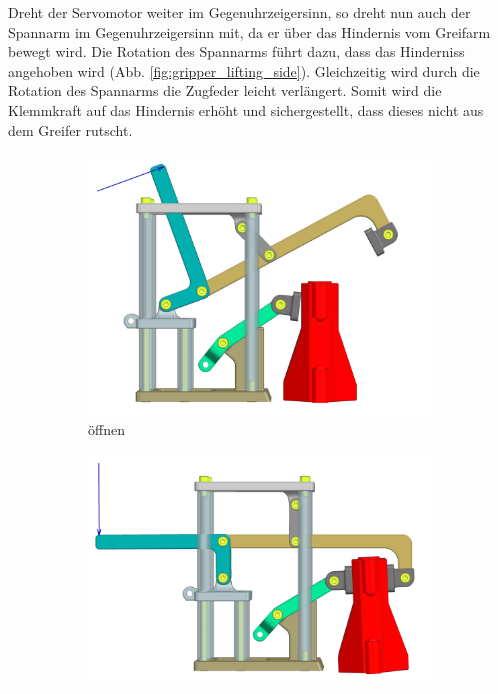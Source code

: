 Dreht der Servomotor weiter im Gegenuhrzeigersinn, so dreht nun auch der Spannarm im Gegenuhrzeigersinn mit, da er über das Hindernis vom Greifarm bewegt wird. Die Rotation des Spannarms führt dazu, dass das Hinderniss angehoben wird (Abb. \ref{fig:gripper_lifting_side}). Gleichzeitig wird durch die Rotation des Spannarms die Zugfeder leicht verlängert. Somit wird die Klemmkraft auf das Hindernis erhöht und sichergestellt, dass dieses nicht aus dem Greifer rutscht.

\begin{figure}[H]
\centering
\begin{subfigure}{0.49\textwidth}
\centering
\includegraphics[width=\textwidth]{assets/greifer-prototyp/Greifer_side_Offen.png}
\caption{öffnen}
\label{fig:gripper_opening_side}
\end{subfigure}
\begin{subfigure}{0.49\textwidth}
\centering
\includegraphics[width=\textwidth]{assets/greifer-prototyp/Greifer_side_Klemmen.png}

\end{subfigure}
\end{figure}
